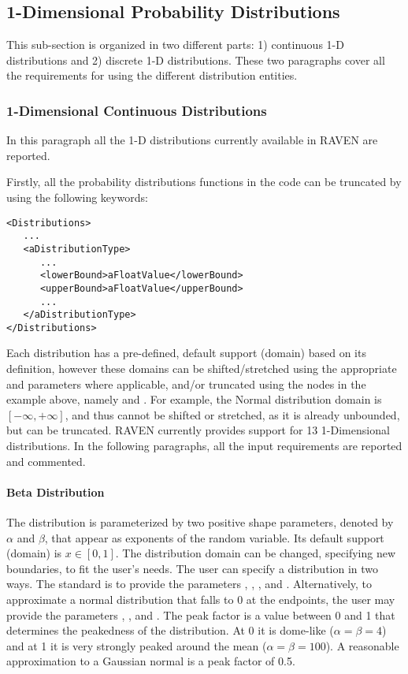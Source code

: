 \subsection{1-Dimensional Probability Distributions}
\label{subsec:1dDist}
This sub-section is organized in two different parts: 1) continuous 1-D
distributions and 2) discrete 1-D distributions.
%
These two paragraphs cover all the requirements for using the different
distribution entities.
%
\subsubsection{1-Dimensional Continuous Distributions}
\label{subsubsec:1DContinuous}
In this paragraph all the 1-D distributions currently available in RAVEN are
reported.

Firstly, all the probability distributions functions in the code can be
truncated by using the following keywords:
\begin{lstlisting}[style=XML]
<Distributions>
   ...
   <aDistributionType>
      ...
      <lowerBound>aFloatValue</lowerBound>
      <upperBound>aFloatValue</upperBound>
      ...
   </aDistributionType>
</Distributions>
\end{lstlisting}
Each distribution has a pre-defined, default support (domain) based on its
definition, however these domains can be shifted/stretched using the appropriate
 and  parameters where applicable, and/or truncated
using the nodes in the example above, namely  and
.
For example, the Normal distribution domain is $[-\infty,+\infty]$, and thus
cannot be shifted or stretched, as it is already unbounded, but can be
truncated.
%
RAVEN currently provides support for 13 1-Dimensional distributions.
%
In the following paragraphs, all the input requirements are reported and
commented.

\paragraph{Beta Distribution}
\label{Beta}
The  distribution is parameterized by two positive shape parameters, denoted by
$\alpha$ and $\beta$, that appear as exponents of the random variable. Its default support
(domain) is $x \in [0, 1]$.
%
The distribution domain can be changed, specifying new boundaries, to fit the user's needs.
%
The user can specify a  distribution in two ways.  The standard
is to provide the parameters , , ,
and .  Alternatively, to approximate a normal
distribution that falls to 0 at the endpoints, the user may provide
the parameters , , and . The
peak factor is a value between 0 and 1 that determines the peakedness of the
distribution.  At 0 it is dome-like ($\alpha=\beta=4$) and at 1 it is very
strongly peaked around the mean ($\alpha=\beta=100$).  A reasonable approximation
to a Gaussian normal is a peak factor of 0.5.

